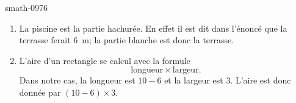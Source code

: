 
\begin{corrige}{smath-0976}

    \begin{enumerate}
        \item
            La piscine est la partie hachurée. En effet il est dit dans l'énoncé que la terrasse ferait \SI{6}{\meter}; la partie blanche est donc la terrasse.
        \item
            L'aire d'un rectangle se calcul avec la formule 
            \begin{equation}
                \text{longueur}\times\text{largeur}.
            \end{equation}
            Dans notre cas, la longueur est \( 10-6\) et la largeur est \( 3\). L'aire est donc donnée par \( (10-6)\times 3\).
    \end{enumerate}

\end{corrige}
